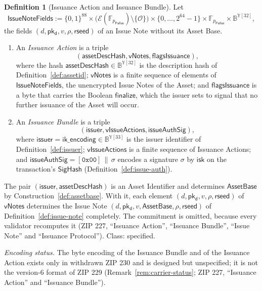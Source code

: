 \documentclass[11pt,a4paper]{article}
\theoremstyle{definition}
\newtheorem{definition}[theorem]{Definition}
\newcommand{\F}{\mathbb{F}}
\newcommand{\Pallas}{\ensuremath{\mathsf{Pallas}}}
\newcommand{\Ep}{\ensuremath{\mathcal{E}}}
\newcommand{\pkd}{\ensuremath{\mathsf{pk_d}}}
\begin{document}
\begin{definition}[Issuance Action and Issuance Bundle]\label{def:issue-bundle}
Let
\[
  \mathsf{IssueNoteFields} := \{0,1\}^{88} \times \bigl(\Ep(\F_{p_{\Pallas}})
    \setminus \{\mathcal{O}\}\bigr) \times \{0, \dots, 2^{64} - 1\} \times
    \F_{p_{\Pallas}} \times \mathbb{B}^{\mathbb{Y}[32]},
\]
the fields $(d, \pkd, v, \rho, \mathsf{rseed})$ of an Issue Note without
its Asset Base.
\begin{enumerate}
\item An \emph{Issuance Action} is a triple
  \[
    (\mathsf{assetDescHash}, \mathsf{vNotes}, \mathsf{flagsIssuance}),
  \]
  where the hash
  $\mathsf{assetDescHash} \in \mathbb{B}^{\mathbb{Y}[32]}$ is the
  description hash of Definition~\ref{def:assetid}; $\mathsf{vNotes}$ is a
  finite sequence of elements of $\mathsf{IssueNoteFields}$, the unencrypted
  Issue Notes of the Asset; and $\mathsf{flagsIssuance}$ is a byte that
  carries the Boolean $\mathsf{finalize}$, which the issuer sets to signal
  that no further issuance of the Asset will occur.
\item An \emph{Issuance Bundle} is a triple
  \[
    (\mathsf{issuer}, \mathsf{vIssueActions}, \mathsf{issueAuthSig}),
  \]
  where
  $\mathsf{issuer} = \mathsf{ik\_encoding} \in \mathbb{B}^{\mathbb{Y}[33]}$
  is the issuer identifier of Definition~\ref{def:issuer};
  $\mathsf{vIssueActions}$ is a finite sequence of Issuance Actions; and
  $\mathsf{issueAuthSig} = [\mathtt{0x00}] \,\|\, \sigma$ encodes a
  signature $\sigma$ by $\mathsf{isk}$ on the transaction's
  $\mathsf{SigHash}$ (Definition~\ref{def:issue-auth}).
\end{enumerate}
The pair $(\mathsf{issuer}, \mathsf{assetDescHash})$ is an Asset
Identifier and determines $\mathsf{AssetBase}$ by
Construction~\ref{def:assetbase}. With it, each element
$(d, \pkd, v, \rho, \mathsf{rseed})$ of $\mathsf{vNotes}$ determines the
Issue Note $(d, \pkd, v, \mathsf{AssetBase}, \rho, \mathsf{rseed})$ of
Definition~\ref{def:issue-note} completely. The commitment is omitted,
because every validator recomputes it (ZIP 227, ``Issuance Action'',
``Issuance Bundle'', ``Issue Note'' and ``Issuance Protocol''). Class:
specified.
\end{definition}

\emph{Encoding status.} The byte encoding of the Issuance Bundle and of the
Issuance Action exists only in withdrawn ZIP 230 and is designed but
unspecified; it is not the version-$6$ format of ZIP 229
(Remark~\ref{rem:carrier-status}; ZIP 227, ``Issuance Action'' and
``Issuance Bundle'').
\end{document}

